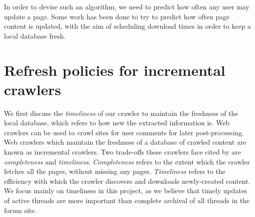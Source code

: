 In order to devise such an algorithm, we need to predict how often any user may 
update a page. 
Some work has been done to try to predict how often page content 
is updated, with the aim of scheduling download times in order to keep a local 
database fresh.


\section{Refresh policies for incremental crawlers}

We first discuss the \emph{timeliness} of our crawler to maintain the freshness 
of the local database, which refers to how new the extracted information is. Web 
crawlers can be used to crawl sites for user comments for 
later post-processing. Web crawlers which maintain the freshness of a database of 
crawled content are known as incremental crawlers. Two trade-offs these crawlers 
face cited by  are \emph{completeness} and \emph{timeliness}.  
\emph{Completeness} refers to the extent which the crawler fetches all the 
pages, without missing any pages. \emph{Timeliness} refers to the efficiency 
with which the crawler discovers and downloads newly-created content. We focus 
mainly on timeliness in this project, as we believe that timely updates of 
active threads are more important than complete archival of all threads in the 
forum site.

